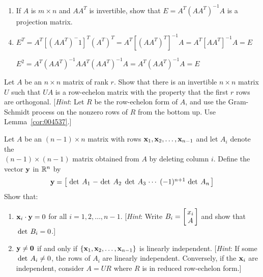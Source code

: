 \begin{multicols}{2}
\begin{ex}
\begin{enumerate}[label={\alph*.}]
\item If $A$ is $m \times n$ and $AA^{T}$ is invertible, show that $E = A^{T}(AA^{T})^{-1}A$ is a projection matrix.

\end{enumerate}
\begin{sol}
\begin{enumerate}[label={\alph*.}]
\setcounter{enumi}{3}
\item  $E^T = A^T[(AA^T)^-1]^T(A^T)^T  = A^T[(AA^T)^T]^{-1}A = A^T[AA^T]^{-1}A = E$

$E^2 = A^T(AA^T)^{-1}AA^T(AA^T)^{-1}A   = A^T(AA^T)^{-1}A = E$
\end{enumerate}
\end{sol}
\end{ex}

\begin{ex}
Let $A$ be an $n \times n$ matrix of rank $r$. Show that there is an invertible $n \times n$ matrix $U$ such that $UA$ is a row-echelon matrix with the property that the first $r$ rows are orthogonal. [\textit{Hint}: Let $R$ be the row-echelon form of $A$, and use the Gram-Schmidt process on the nonzero rows of $R$ from the bottom up. Use Lemma~\ref{cor:004537}.]
\end{ex}

\begin{ex}
Let $A$ be an $(n - 1) \times n$ matrix with rows $\textbf{x}_{1}, \textbf{x}_{2}, \dots, \textbf{x}_{n-1}$ and let $A_{i}$ denote the \\ $(n - 1) \times (n - 1)$ matrix obtained from $A$ by deleting column $i$. Define the vector $\textbf{y}$ in $\mathbb{R}^n$ by \begin{equation*}
\vect{y} = \leftB \def\arraycolsep{1.5pt} \begin{array}{ccccc} \func{det}A_{1} & -\func{det}A_{2} & \func{det}A_{3} & \cdots & (-1)^{n+1} \func{det}A_{n} \end{array}\rightB
\end{equation*} Show that:


\begin{enumerate}[label={\alph*.}]
\item $\textbf{x}_{i} \cdot \textbf{y} = 0$ for all $i = 1, 2, \dots , n - 1$. [\textit{Hint}: Write $B_{i} = \leftB \begin{array}{c}
x_{i} \\
A
\end{array} \rightB$ and show that $\thinspace\operatorname{det\medspace}B_{i} = 0$.]

\item $\textbf{y} \neq \textbf{0}$ if and only if $\{\textbf{x}_{1}, \textbf{x}_{2}, \dots , \textbf{x}_{n-1}\}$ is linearly independent. [\textit{Hint}: If some $\thinspace\operatorname{det\medspace}A_{i} \neq 0$, the rows of $A_{i}$ are linearly independent. Conversely, if the $\textbf{x}_{i}$ are independent, consider $A = UR$ where $R$ is in reduced row-echelon form.]


\end{enumerate}
\end{ex}
\end{multicols}
